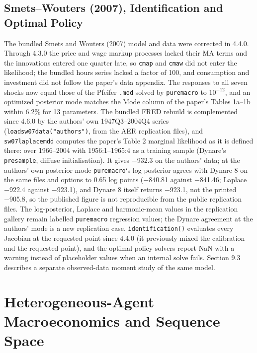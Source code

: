 \documentclass[11pt,letterpaper]{article}
\renewcommand{\_}{\pmunderscore\allowbreak}
\begin{document}
\subsection{Smets--Wouters (2007), Identification and Optimal Policy}\label{smetswouters-2007-identification-and-optimal-policy}

The bundled Smets and Wouters (2007) model and data were corrected in 4.4.0. Through 4.3.0 the price and wage markup processes lacked their MA terms and the innovations entered one quarter late, so \texttt{cmap} and \texttt{cmaw} did not enter the likelihood; the bundled hours series lacked a factor of 100, and consumption and investment did not follow the paper's data appendix. The responses to all seven shocks now equal those of the Pfeifer \texttt{.mod} solved by \texttt{puremacro} to \(10^{-12}\), and an optimized posterior mode matches the Mode column of the paper's Tables 1a--1b within 6.2\% for 13 parameters. The bundled FRED rebuild is complemented since 4.6.0 by the authors' own 1947Q3--2004Q4 series (\texttt{load\_sw07\_data("authors")}, from the AER replication files), and \texttt{sw07\_laplace\_mdd} computes the paper's Table 2 marginal likelihood as it is defined there: over 1966--2004 with 1956:1--1965:4 as a training sample (Dynare's \texttt{presample}, diffuse initialisation). It gives −932.3 on the authors' data; at the authors' own posterior mode \texttt{puremacro}`s log posterior agrees with Dynare 8 on the same files and options to 0.65 log points (−840.81 against −841.46; Laplace −922.4 against −923.1), and Dynare 8 itself returns −923.1, not the printed −905.8, so the published figure is not reproducible from the public replication files. The log-posterior, Laplace and harmonic-mean values in the replication gallery remain labelled \texttt{puremacro} regression values; the Dynare agreement at the authors' mode is a new replication case. \texttt{identification()} evaluates every Jacobian at the requested point since 4.4.0 (it previously mixed the calibration and the requested point), and the optimal-policy solvers report NaN with a warning instead of placeholder values when an internal solve fails. Section 9.3 describes a separate observed-data moment study of the same model.

\section{Heterogeneous-Agent Macroeconomics and Sequence Space}\label{heterogeneous-agent-macroeconomics-and-sequence-space}
\end{document}
